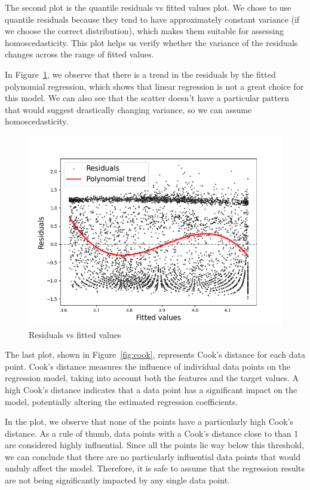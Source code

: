 \documentclass[9pt]{IEEEtran}
\begin{document}
The second plot is the quantile residuals vs fitted values plot. We chose to use quantile
 residuals because they tend to have approximately constant variance (if we choose the correct 
 distribution), which makes them suitable
  for assessing homoscedasticity. This plot
   helps us verify whether the variance of the residuals changes across the range of fitted values.

In Figure~\ref{fig:res_vs_fitted}, we observe that there is a trend in the residuals by the 
fitted polynomial regression, which shows that linear regression is not a great choice for 
this model. We can also see that the scatter doesn't have a particular pattern that would suggest 
drastically changing variance, so we can assume homoscedasticity. 


\begin{figure}[h]
    \centering
    \includegraphics[width=0.9\columnwidth]{figures/res_vs_fitted.png}
    \caption{Residuals vs fitted values}
    \label{fig:res_vs_fitted}
\end{figure}

The last plot, shown in Figure~\ref{fig:cook}, represents Cook's distance for each data point.
 Cook's distance measures the influence of individual data points on the regression model,
  taking into account both the features and the target values. A high Cook's distance indicates
   that a data point has a significant impact on the model, potentially altering the estimated 
   regression coefficients.

In the plot, we observe that none of the points have a particularly high Cook's distance.
 As a rule of thumb, data points with a Cook's distance close to  than 1 are 
 considered highly influential. Since all the points lie way below this threshold, we can 
 conclude that there are no particularly influential data points that would unduly affect 
 the model. Therefore, it is safe to assume that the regression results are not being 
 significantly impacted by any single data point.
\end{document}
